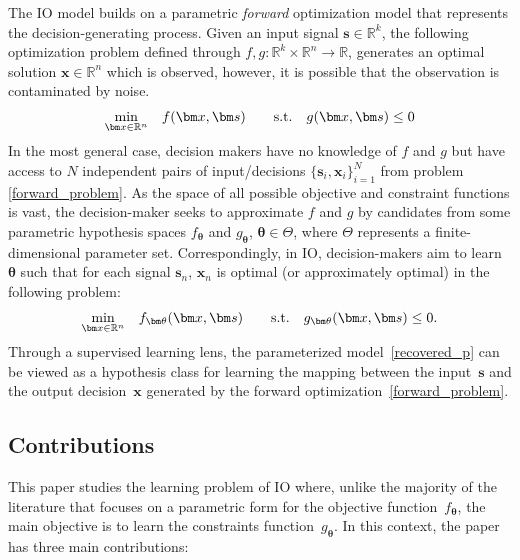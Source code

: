 \documentclass{article}
\def\x{\bm{x}}
\def\s{\bm{s}}
\def\btheta{\bm{\theta}}
\theoremstyle{plain}
\begin{document}
The IO model builds on a parametric \emph{forward} optimization model that represents the decision-generating process. Given an input signal $\bm s\in\mathbb{R}^k$, the following optimization problem defined through $f,g:\mathbb{R}^k\times\mathbb{R}^n\rightarrow \mathbb{R}$, generates an optimal solution $\bm x\in\mathbb{R}^n$ which is observed, however, it is possible that the observation is contaminated by noise. 
\begin{equation}\label{forward_problem}
    \begin{array} {cl}
        \displaystyle\min_{\bm x\in\mathbb{R}^n}
        & f(\bm x,\bm s) \qquad {\rm s.t.} \quad  g(\bm x,\bm s) \leq 0
    \end{array}
\end{equation}
In the most general case, decision makers have no knowledge of $f$ and $g$  but have access to $N$ independent pairs of input/decisions $\{\s_i,\x_i\}_{i = 1}^N$ from problem \eqref{forward_problem}.  As the space of all possible objective and constraint functions is vast, the decision-maker seeks to approximate $f$ and $g$ by candidates from some parametric hypothesis spaces $f_{\btheta}$ and $g_{\btheta}$, $\btheta \in \Theta$, where $\Theta$ represents a finite-dimensional parameter set. Correspondingly, in IO, decision-makers aim to learn $\btheta$ such that for each signal $\s_n$, $\x_n$ is optimal (or approximately optimal) in the following problem:
\begin{equation}\label{recovered_p}
   \begin{array}{cl}
        \displaystyle\min_{\bm x \in\mathbb{R}^n}
        & f_{\bm \theta}(\bm x,\bm s) \qquad {\rm s.t.} \quad  g_{\bm \theta}(\bm x,\bm s) \leq 0.
    \end{array}
\end{equation}
Through a supervised learning lens, the parameterized model~\eqref{recovered_p} can be viewed as a hypothesis class for learning the mapping between the input~$\bm s$ and the output decision~$\bm x$ generated by the forward optimization~\eqref{forward_problem}. 
 
\subsection{Contributions}
This paper studies the learning problem of IO where, unlike the majority of the literature that focuses on a parametric form for the objective function~$f_{\bm \theta}$, the main objective is to learn the constraints function~$g_{\bm \theta}$. In this context, the paper has three main contributions:  
\end{document}
